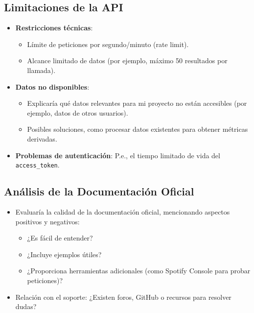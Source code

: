 \subsection{Limitaciones de la API}
\begin{itemize}
    \item \textbf{Restricciones técnicas}:
          \begin{itemize}
              \item Límite de peticiones por segundo/minuto (rate limit).
              \item Alcance limitado de datos (por ejemplo, máximo 50 resultados por llamada).
          \end{itemize}
    \item \textbf{Datos no disponibles}:
          \begin{itemize}
              \item Explicaría qué datos relevantes para mi proyecto no están accesibles (por ejemplo, datos de otros usuarios).
              \item Posibles soluciones, como procesar datos existentes para obtener métricas derivadas.
          \end{itemize}
    \item \textbf{Problemas de autenticación}: P.e., el tiempo limitado de vida del \texttt{access\_token}.
\end{itemize}

\subsection{Análisis de la Documentación Oficial}
\begin{itemize}
    \item Evaluaría la calidad de la documentación oficial, mencionando aspectos positivos y negativos:
          \begin{itemize}
              \item ¿Es fácil de entender?
              \item ¿Incluye ejemplos útiles?
              \item ¿Proporciona herramientas adicionales (como Spotify Console para probar peticiones)?
          \end{itemize}
    \item Relación con el soporte: ¿Existen foros, GitHub o recursos para resolver dudas?
\end{itemize}

